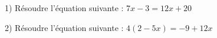 \begin{minipage}{0.99\linewidth}

\exo

1) Résoudre l'équation suivante : $7x-3 = 12x + 20$


2) Résoudre l'équation suivante : $ 4(2-5x) = -9 + 12x$  
   
\end{minipage}

\vspace{0.5cm}
